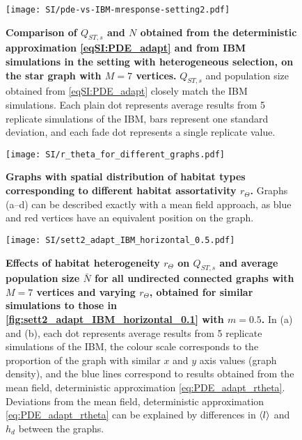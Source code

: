 
\begin{figure}[ht]
  \centering
      \texttt{[image: SI/pde-vs-IBM-mresponse-setting2.pdf]}
    \caption{ \textbf{Comparison of $Q_{ST,s}$ and $N$ obtained from the deterministic approximation \cref{eqSI:PDE_adapt} and from IBM simulations in the setting with heterogeneous selection, on the star graph with $M=7$ vertices.} $Q_{ST,s}$ and population size obtained from \cref{eqSI:PDE_adapt} closely match the IBM simulations. Each plain dot represents average results from 5 replicate simulations of the IBM, bars represent one standard deviation, and each fade dot represents a single replicate value.}
    \label{figSI:pde-vs-IBM-mresponse-setting2}
\end{figure}

\begin{figure}[ht]
  \centerline{
      \texttt{[image: SI/r\_theta\_for\_different\_graphs.pdf]} 
  }
  \caption{\textbf{Graphs with spatial distribution of habitat types corresponding to different habitat assortativity $r_\Theta$.} Graphs (a–d) can be described exactly with a mean field approach, as blue and red vertices have an equivalent position on the graph.}
  \label{figSI:graph_rtheta}
\end{figure}

\begin{figure}[ht]
  \centerline{
      \texttt{[image: SI/sett2\_adapt\_IBM\_horizontal\_0.5.pdf]} 
  }
  \caption{\textbf{Effects of habitat heterogeneity $r_\Theta$ on $Q_{ST,s}$ and average population size $\bar{N}$ for all undirected connected graphs with $M=7$ vertices and varying $r_\Theta$, obtained for similar simulations to those in \cref{fig:sett2_adapt_IBM_horizontal_0.1} with $m = 0.5$.} In (a) and (b), each dot represents average results from 5 replicate simulations of the IBM, the colour scale corresponds to the proportion of the graph with similar $x$ and $y$ axis values (graph density), and the blue lines correspond to results obtained from the mean field, deterministic approximation \cref{eq:PDE_adapt_rtheta}. Deviations from the mean field, deterministic approximation \cref{eq:PDE_adapt_rtheta} can be explained by differences in $\langle l \rangle$ and $h_d$ between the graphs.}
  \label{figSI:sett2_adapt_IBM_horizontal_0.5}
\end{figure}
\FloatBarrier


